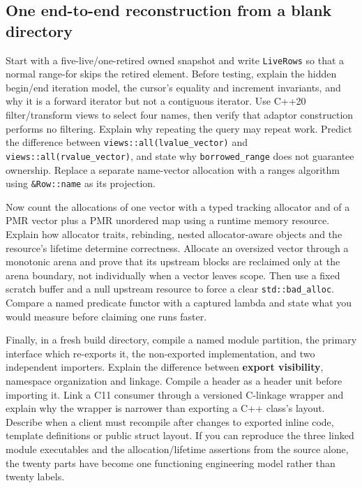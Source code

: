 \subsection{One end-to-end reconstruction from a blank directory}\label{05-engine-i-ch006-one-end-to-end-reconstruction-from-a-blank-directory}

Start with a five-live/one-retired owned snapshot and write \texttt{LiveRows} so that a normal range-for skips the retired element. Before testing, explain the hidden begin/end iteration model, the cursor's equality and increment invariants, and why it is a forward iterator but not a contiguous iterator. Use C++20 filter/transform views to select four names, then verify that adaptor construction performs no filtering. Explain why repeating the query may repeat work. Predict the difference between \texttt{views::all(lvalue\_vector)} and \texttt{views::all(rvalue\_vector)}, and state why \texttt{borrowed\_range} does not guarantee ownership. Replace a separate name-vector allocation with a ranges algorithm using \texttt{\&Row::name} as its projection.

Now count the allocations of one vector with a typed tracking allocator and of a PMR vector plus a PMR unordered map using a runtime memory resource. Explain how allocator traits, rebinding, nested allocator-aware objects and the resource's lifetime determine correctness. Allocate an oversized vector through a monotonic arena and prove that its upstream blocks are reclaimed only at the arena boundary, not individually when a vector leaves scope. Then use a fixed scratch buffer and a null upstream resource to force a clear \texttt{std::bad\_alloc}. Compare a named predicate functor with a captured lambda and state what you would measure before claiming one runs faster.

Finally, in a fresh build directory, compile a named module partition, the primary interface which re-exports it, the non-exported implementation, and two independent importers. Explain the difference between \textbf{export visibility}, namespace organization and linkage. Compile a header as a header unit before importing it. Link a C11 consumer through a versioned C-linkage wrapper and explain why the wrapper is narrower than exporting a C++ class's layout. Describe when a client must recompile after changes to exported inline code, template definitions or public struct layout. If you can reproduce the three linked module executables and the allocation/lifetime assertions from the source alone, the twenty parts have become one functioning engineering model rather than twenty labels.

